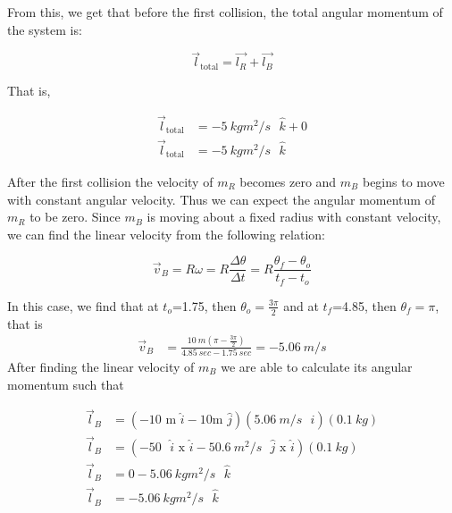 \documentclass[12pt]{article}
\begin{document}
From this, we get that before the first collision, the total angular momentum of the system is:

\begin{equation} \label{eq2}
    \vec{l}_\text{total} = \vec{l_R} + \vec{l_B}
\end{equation}

That is,

\begin{equation*}
    \begin{split}
        \vec{l}_\text{total} & = \SI{-5}{kg m^2/s} \text{ $\hat{k}$} + 0 \\
        \vec{l}_\text{total} & = \SI{-5}{kg m^2/s} \text{ $\hat{k}$}
    \end{split}
\end{equation*}

After the first collision the velocity of $m_R$ becomes zero and $m_B$ begins to move with constant angular velocity. Thus we can expect the angular momentum of $m_R$ to be zero. Since $m_B$ is moving about a fixed radius with constant velocity, we can find the linear velocity from the following relation:

\begin{equation} \label{eq3}
    \vec{v}_B = R \omega = R \frac{\Delta \theta}{\Delta t} = R \frac{\theta_f - \theta_o}{t_f - t_o}
\end{equation}

In this case, we find that at $t_o$=1.75, then $\theta_o = \frac{3\pi}{2}$ and at $t_f$=4.85, then $\theta_f = \pi$, that is
\begin{equation*}
    \begin{split}
        \vec{v}_B & = \frac{\SI{10}{m}(\pi - \frac{3\pi}{2})}{\SI{4.85}{sec} - \SI{1.75}{sec}} = \SI{-5.06}{m/s}
    \end{split}
\end{equation*}
After finding the linear velocity of $m_B$ we are able to calculate its angular momentum such that

\begin{equation*}
    \begin{split}
        \vec{l}_B & = (-10 \text{ m $\hat{i}$} - 10 \text{m $\hat{j}$})(\SI{5.06}{m/s} \text{ $\hat{i}$}) (\SI{0.1}{kg}) \\
        \vec{l}_B & = (-50 \text{ $\hat{i}$ x $\hat{i}$} - \SI{50.6}{m^2/s} \text{ $\hat{j}$ x $\hat{i}$}) (\SI{0.1}{kg}) \\
        \vec{l}_B & = 0 - \SI{5.06}{kg m^2/s} \text{ $\hat{k}$} \\
        \vec{l}_B & = \SI{-5.06}{kg m^2/s} \text{ $\hat{k}$}
    \end{split}
\end{equation*}
\end{document}
